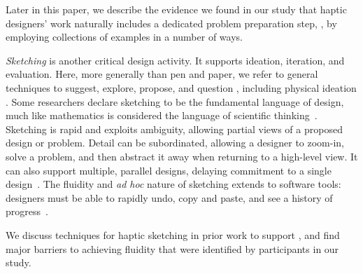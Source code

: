 Later in this paper, we describe the evidence we found in our study that haptic designers' work naturally includes a dedicated problem preparation step, \eg, by employing collections of examples in a number of ways.



\textit{Sketching} is another critical design activity. It supports ideation, iteration, and evaluation. %
Here, more generally than  pen and paper, we refer to general techniques to suggest, explore, propose, and question \citep{Buxton2007}, including physical ideation \citep{Moussette2010}.
Some researchers declare sketching to be the fundamental language of design, much like mathematics is considered the language of scientific thinking~\citep{Cross2006}.
Sketching is rapid and exploits ambiguity, allowing partial views of a proposed design or problem.
Detail can be subordinated, allowing a designer to zoom-in, solve a problem, and then
abstract it away when returning to a high-level view.
It can also support multiple, parallel designs, delaying commitment to a single design~\citep{Hartmann2008,Resnick2008}.
The fluidity and \textit{ad hoc} nature of sketching extends to software tools: designers must be able to rapidly undo, copy and paste, and see a history of progress~\citep{Resnick2008}.

We discuss techniques for haptic sketching in prior work to support \haxd, and find major barriers to achieving fluidity that were identified by participants in our study.


